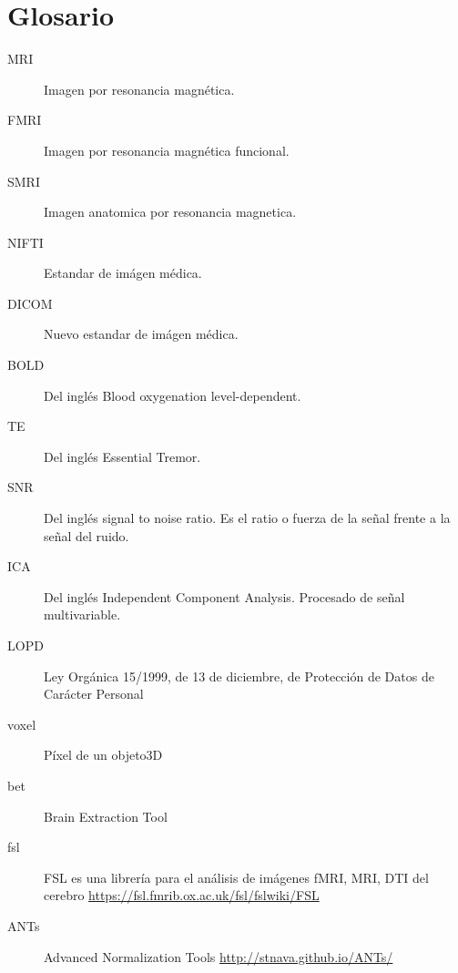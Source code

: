 
\chapter{Glosario}
\begin{description}
\item[MRI] Imagen por resonancia magnética. \label{glos:mri}
\item[FMRI] Imagen por resonancia magnética funcional. \label{glos:fmri}
\item[SMRI] Imagen anatomica por resonancia magnetica. \label{glos:smri}
\item[NIFTI] Estandar de imágen médica. \label{glos:nifti}
\item[DICOM] Nuevo estandar de imágen médica. \label{glos:dicom}
\item[BOLD] Del inglés Blood oxygenation level-dependent. \label{glos:bold}
\item[TE] Del inglés Essential Tremor. \label{glos:et}
\item[SNR] Del inglés signal to noise ratio. Es el ratio o fuerza de la señal frente a la señal del ruido. \label{glos:snr}
\item[ICA] Del inglés Independent Component Analysis. Procesado de señal multivariable. \label{glos:ica}
\item[LOPD] Ley Orgánica 15/1999, de 13 de diciembre, de Protección de Datos de Carácter Personal
 \label{glos:ica}
\item[voxel] Píxel de un objeto3D
\item[bet] Brain Extraction Tool
\item[fsl]  FSL es una librería para el análisis de imágenes fMRI, MRI, DTI del cerebro \url{https://fsl.fmrib.ox.ac.uk/fsl/fslwiki/FSL}
\item[ANTs] Advanced Normalization Tools \url{http://stnava.github.io/ANTs/}
 \end{description}